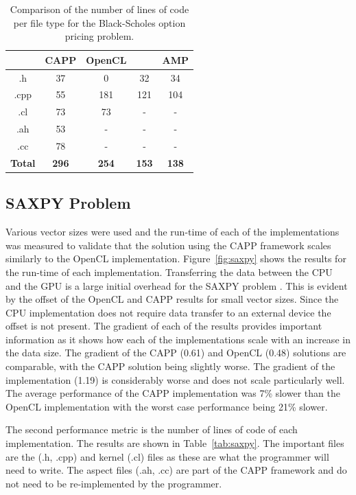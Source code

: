 \documentclass{sig-alternate-05-2015}
\begin{document}
\begin{table}[!b]
\centering
\caption{Comparison of the number of lines of code per file type for the
Black-Scholes option pricing problem.}
\label{tab:blackscholes}
\begin{tabular}{|c|c|c|c|c|} 
	\hline
                    & CAPP			& OpenCL		& \CPP		& \CPP AMP          \\ \hline
    .h				& 37			& 0				& 32		& 34                \\ \hline
    .cpp			& 55			& 181			& 121		& 104               \\ \hline
    .cl				& 73			& 73			& -			& -                 \\ \hline
    .ah				& 53			& -				& -			& -                 \\ \hline
    .cc				& 78			& -				& -			& -                 \\ \hline
    \textbf{Total}	& \textbf{296}	& \textbf{254}	& \textbf{153}	& \textbf{138}	\\ \hline		
\hline
\end{tabular}
\end{table}

\subsection{SAXPY Problem}

Various vector sizes were used and the run-time of each of the implementations
was measured to validate that the solution using the
 CAPP framework scales similarly to the OpenCL implementation. Figure~\ref{fig:saxpy} 
shows the results for the run-time of each implementation. Transferring
the data between the CPU and the GPU is a large initial overhead for the SAXPY problem
\cite{gregg:saxpy}. This is evident by the offset of the
OpenCL and CAPP results for small vector sizes. Since the CPU implementation
does not require data transfer to an external device the offset is not present.
The gradient of each of the results provides important information as it shows
how each of the implementations scale with an increase in the data size. 
The gradient of the CAPP (0.61) and OpenCL (0.48) solutions are comparable, with
the CAPP solution being slightly worse. The gradient of the \CPP
implementation (1.19) is considerably worse and does not scale particularly
well. The average performance of the CAPP implementation was 7\% slower
than the OpenCL implementation with the worst case performance being 21\%
slower.

The second performance metric is the number of lines
of code of each implementation. The results are shown in 
Table~\ref{tab:saxpy}. The important files are the \CPP (.h, .cpp) and kernel (.cl)
files as these are what the programmer will need to write. The aspect files (.ah, .cc) are
part of the  CAPP framework and do not need to be re-implemented by the programmer. 
\end{document}
